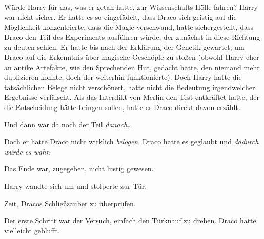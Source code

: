 Würde Harry für das, was er getan hatte, zur Wissenschafts-Hölle fahren? Harry war nicht sicher. Er hatte es so eingefädelt, dass Draco sich geistig auf die Möglichkeit konzentrierte, dass die Magie verschwand, hatte sichergestellt, dass Draco den Teil des Experiments ausführen würde, der zunächst in diese Richtung zu deuten schien. Er hatte bis nach der Erklärung der Genetik gewartet, um Draco auf die Erkenntnis über magische Geschöpfe zu stoßen (obwohl Harry eher an antike Artefakte, wie den Sprechenden Hut, gedacht hatte, den niemand mehr duplizieren konnte, doch der weiterhin funktionierte). Doch Harry hatte die tatsächlichen Belege nicht verschönert, hatte nicht die Bedeutung irgendwelcher Ergebnisse verfälscht. Als das Interdikt von Merlin den Test entkräftet hatte, der die Entscheidung hätte bringen sollen, hatte er Draco direkt davon erzählt.

Und dann war da noch der Teil \emph{danach}…

Doch er hatte Draco nicht wirklich \emph{belogen}. Draco hatte es geglaubt und \emph{dadurch würde es wahr}.

Das Ende war, zugegeben, nicht lustig gewesen.

Harry wandte sich um und stolperte zur Tür.

Zeit, Dracos Schließzauber zu überprüfen.

Der erste Schritt war der Versuch, einfach den Türknauf zu drehen. Draco hatte vielleicht geblufft.

